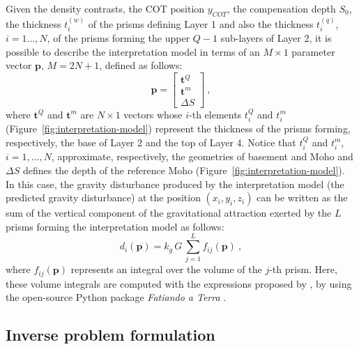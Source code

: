 \documentclass[manuscript]{geophysics}
\begin{document}
Given the density contrasts, the COT position $y_{COT}$, the compensation
depth $S_{0}$, the thickness $t^{(w)}_{i}$ of the prisms defining Layer 1 and 
also the thickness $t^{(q)}_{i}$, $i = 1 \dots, N$, of the prisms forming the 
upper $Q-1$ sub-layers of Layer 2, it is possible to describe the interpretation
model in terms of an $M \times 1$ parameter vector $\mathbf{p}$, $M = 2N + 1$, defined
as follows:
\begin{equation}
\mathbf{p} = \begin{bmatrix}
\mathbf{t}^{Q} \\
\mathbf{t}^{m} \\
\Delta S
\end{bmatrix} \: ,
\label{eq:parameter-vector}
\end{equation}
where $\mathbf{t}^{Q}$ and $\mathbf{t}^{m}$ are $N \times 1$ vectors whose $i$-th
elements $t^{Q}_{i}$ and $t^{m}_{i}$ (Figure~\ref{fig:interpretation-model}) 
represent the thickness of the
prisms forming, respectively, the base of Layer 2 and the top of Layer 4.
Notice that $t^{Q}_{i}$ and $t^{m}_{i}$, $i = 1, \dots, N$, approximate, respectively, the 
geometries of basement and Moho and $\Delta S$ defines the depth of the
reference Moho (Figure~\ref{fig:interpretation-model}).
In this case, the gravity disturbance produced by the interpretation model (the
predicted gravity disturbance) at the position $(x_{i}, y_{i}, z_{i})$ can be written
as the sum of the vertical component of the gravitational attraction exerted by the $L$
prisms forming the interpretation model as follows:
\begin{equation}
d_{i}(\mathbf{p}) = k_{g} \, G \, \sum_{j = 1}^{L} f_{ij}(\mathbf{p}) \: ,
\label{eq:ith-predicted-data}
\end{equation}
where $f_{ij}(\mathbf{p})$ represents an integral over the volume of the $j$-th 
prism. Here, these volume integrals are computed with the expressions proposed 
by \citet{nagy-etal2000}, by using the open-source Python package 
\textit{Fatiando a Terra} \citep{uieda-etal2013}.


\subsection{Inverse problem formulation}
\end{document}
